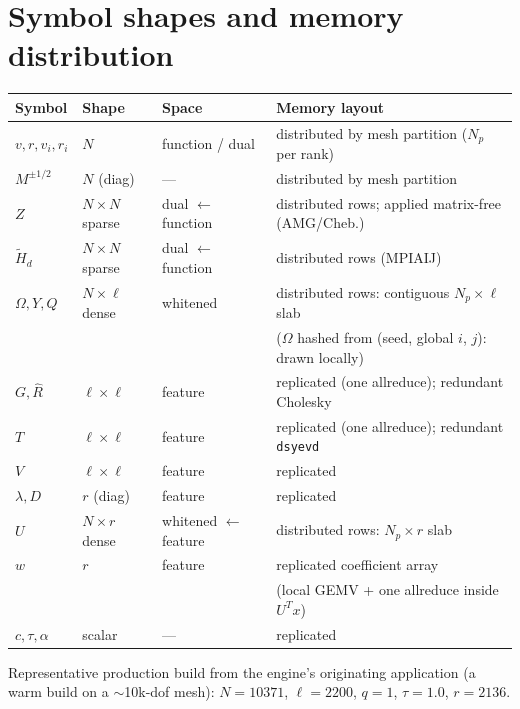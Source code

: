 \documentclass[11pt]{article}
\begin{document}
\section*{Symbol shapes and memory distribution}
\begin{center}
\begin{tabular}{llll}
\toprule
Symbol & Shape & Space & Memory layout \\
\midrule
$v, r, v_i, r_i$ & $N$ & function / dual & distributed by mesh partition ($N_p$ per rank) \\
$M^{\pm 1/2}$ & $N$ (diag) & --- & distributed by mesh partition \\
$Z$ & $N \times N$ sparse & dual $\leftarrow$ function & distributed rows; applied matrix-free (AMG/Cheb.) \\
$\widetilde{H}_d$ & $N \times N$ sparse & dual $\leftarrow$ function & distributed rows (MPIAIJ) \\
$\Omega, Y, Q$ & $N \times \ell$ dense & whitened & distributed rows: contiguous $N_p \times \ell$ slab \\
 & & & ($\Omega$ hashed from (seed, global $i$, $j$): drawn locally) \\
$G, \widehat{R}$ & $\ell \times \ell$ & feature & replicated (one allreduce); redundant Cholesky \\
$T$ & $\ell \times \ell$ & feature & replicated (one allreduce); redundant \texttt{dsyevd} \\
$V$ & $\ell \times \ell$ & feature & replicated \\
$\lambda, D$ & $r$ (diag) & feature & replicated \\
$U$ & $N \times r$ dense & whitened $\leftarrow$ feature & distributed rows: $N_p \times r$ slab \\
$w$ & $r$ & feature & replicated coefficient array \\
 & & & (local GEMV + one allreduce inside $U^T x$) \\
$c, \tau, \alpha$ & scalar & --- & replicated \\
\bottomrule
\end{tabular}
\end{center}

Representative production build from the engine's originating application (a warm
build on a $\sim$10k-dof mesh): $N = 10371$, $\ell = 2200$, $q = 1$, $\tau = 1.0$,
$r = 2136$.
\end{document}
